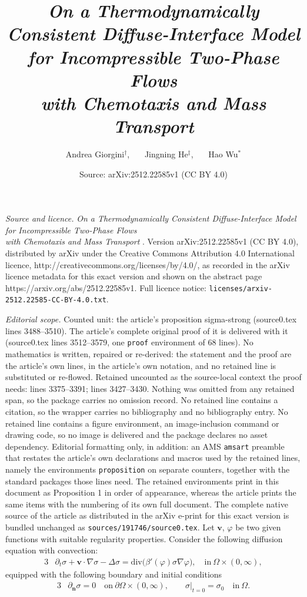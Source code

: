 \documentclass[10pt,a4paper]{amsart}
\title{\emph{On a Thermodynamically Consistent Diffuse-Interface Model for Incompressible Two-Phase Flows \\ with Chemotaxis and Mass Transport }}
\author{Andrea Giorgini$^\dagger$, \ \ \ Jingning He$^\ddagger$, \ \ \ Hao Wu$^\ast$}
\date{Source: arXiv:2512.22585v1 (CC BY 4.0)}
\def\vv{\bm{v}}
\begin{document}
\maketitle

\noindent\emph{Source and licence.} \emph{On a Thermodynamically Consistent Diffuse-Interface Model for Incompressible Two-Phase Flows \\ with Chemotaxis and Mass Transport }. Version arXiv:2512.22585v1 (CC BY 4.0), distributed by arXiv under the Creative Commons Attribution 4.0 International licence, http://creativecommons.org/licenses/by/4.0/, as recorded in the arXiv licence metadata for this exact version and shown on the abstract page https://arxiv.org/abs/2512.22585v1. Full licence notice: \texttt{licenses/arxiv-2512.22585-CC-BY-4.0.txt}.\par\smallskip

\noindent\textit{Editorial scope.} Counted unit: the article's proposition sigma-strong (source0.tex lines 3488--3510). The article's complete original proof of it is delivered with it (source0.tex lines 3512--3579, one \texttt{proof} environment of 68 lines). No mathematics is written, repaired or re-derived: the statement and the proof are the article's own lines, in the article's own notation, and no retained line is substituted or re-flowed.  Retained uncounted as the source-local context the proof needs: lines 3375--3391; lines 3427--3430.  Nothing was omitted from any retained span, so the package carries no omission record.  No retained line contains a citation, so the wrapper carries no bibliography and no bibliography entry.  No retained line contains a figure environment, an image-inclusion command or drawing code, so no image is delivered and the package declares no asset dependency.  Editorial formatting only, in addition: an AMS \texttt{amsart} preamble that restates the article's own declarations and macros used by the retained lines, namely the environments \texttt{proposition} on separate counters, together with the standard packages those lines need.  The retained environments print in this document as Proposition 1 in order of appearance, whereas the article prints the same items with the numbering of its own full document.  The complete native source of the article as distributed in the arXiv e-print for this exact version is bundled unchanged as \texttt{sources/191746/source0.tex}.
Let $\vv$, $\varphi$ be two given functions with suitable regularity properties. Consider the following diffusion equation with convection:
%
\begin{alignat}{3}
&\partial_t\sigma +\vv\cdot\nabla\sigma -\Delta\sigma
=  \mathrm{div}\big(\beta'(\varphi)\sigma \nabla \varphi\big),
\quad \text{in}\ \Omega\times (0,\infty),
\label{re-di-sigma}
\end{alignat}
%
equipped with the following boundary and initial conditions
%
\begin{alignat}{3}
&\partial_{\boldsymbol{n}} \sigma =0  \quad \text{on}\ \partial\Omega\times(0,\infty),
\qquad \sigma|_{t=0}=\sigma_{0} \quad \text{in}\ \Omega.
\label{re-di-sigma-bdini}
\end{alignat}
%
\end{document}
